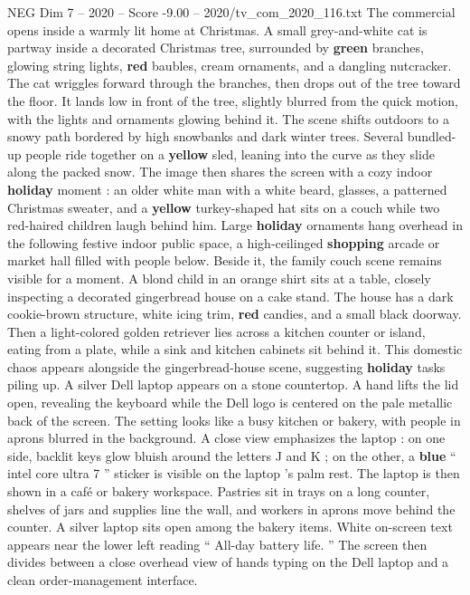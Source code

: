 \begin{textsample}{NEG Dim 7 – 2020 – Score -9.00 – 2020/tv\_com\_2020\_116.txt}  \label{ex:f7_neg_001}
The commercial opens inside a warmly lit home at Christmas.
A small grey-and-white cat is partway inside a decorated Christmas tree, surrounded by \textbf{green} branches, glowing string lights, \textbf{red} baubles, cream ornaments, and a dangling nutcracker.
The cat wriggles forward through the branches, then drops out of the tree toward the floor.
It lands low in front of the tree, slightly blurred from the quick motion, with the lights and ornaments glowing behind it.
The scene shifts outdoors to a snowy path bordered by high snowbanks and dark winter trees.
Several bundled-up people ride together on a \textbf{yellow} sled, leaning into the curve as they slide along the packed snow.
The image then shares the screen with a cozy indoor \textbf{holiday} moment : an older white man with a white beard, glasses, a patterned Christmas sweater, and a \textbf{yellow} turkey-shaped hat sits on a couch while two red-haired children laugh behind him.
Large \textbf{holiday} ornaments hang overhead in the following festive indoor public space, a high-ceilinged \textbf{shopping} arcade or market hall filled with people below.
Beside it, the family couch scene remains visible for a moment.
A blond child in an orange shirt sits at a table, closely inspecting a decorated gingerbread house on a cake stand.
The house has a dark cookie-brown structure, white icing trim, \textbf{red} candies, and a small black doorway.
Then a light-colored golden retriever lies across a kitchen counter or island, eating from a plate, while a sink and kitchen cabinets sit behind it.
This domestic chaos appears alongside the gingerbread-house scene, suggesting \textbf{holiday} tasks piling up.
A silver Dell laptop appears on a stone countertop.
A hand lifts the lid open, revealing the keyboard while the Dell logo is centered on the pale metallic back of the screen.
The setting looks like a busy kitchen or bakery, with people in aprons blurred in the background.
A close view emphasizes the laptop : on one side, backlit keys glow bluish around the letters J and K ; on the other, a \textbf{blue} “ intel core ultra 7 ” sticker is visible on the laptop ’s palm rest.
The laptop is then shown in a café or bakery workspace.
Pastries sit in trays on a long counter, shelves of jars and supplies line the wall, and workers in aprons move behind the counter.
A silver laptop sits open among the bakery items.
White on-screen text appears near the lower left reading “ All-day battery life. ” The screen then divides between a close overhead view of hands typing on the Dell laptop and a clean order-management interface.

\end{textsample}
